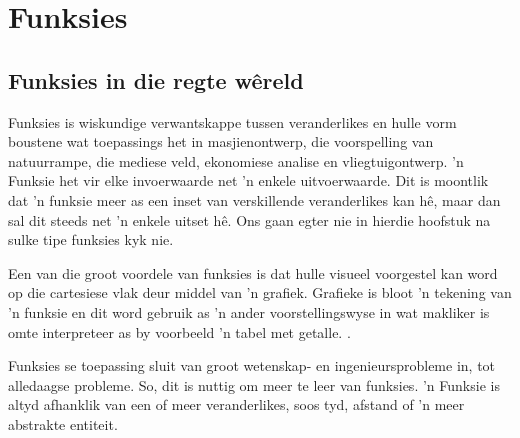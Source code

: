 \chapter{Funksies}
\setcounter{figure}{0}
\setcounter{subfigure}{0}

\section{Funksies in die regte w\^ereld}
Funksies is wiskundige verwantskappe tussen veranderlikes en hulle vorm boustene wat toepassings het in masjienontwerp, die voorspelling van natuurrampe, die mediese veld,
ekonomiese analise en vliegtuigontwerp. ’n Funksie het vir elke invoerwaarde net ’n enkele uitvoerwaarde. Dit is moontlik dat
’n funksie meer as een inset van verskillende veranderlikes kan hê, maar dan sal dit steeds net ’n enkele uitset hê. Ons gaan
egter nie in hierdie hoofstuk na sulke tipe funksies kyk nie.\par 
Een van die groot voordele van funksies is dat hulle visueel voorgestel kan word op die cartesiese vlak deur middel van ’n grafiek.
Grafieke is bloot ’n tekening van ’n funksie en dit word gebruik as ’n ander voorstellingswyse in wat makliker is omte interpreteer as by voorbeeld ’n tabel met getalle.
.\par 
Funksies se toepassing sluit van groot wetenskap- en ingenieursprobleme in, tot alledaagse probleme. So, dit is nuttig om meer
te leer van funksies. ’n Funksie is altyd afhanklik van een of meer veranderlikes, soos tyd, afstand of ’n meer abstrakte entiteit.\par 

